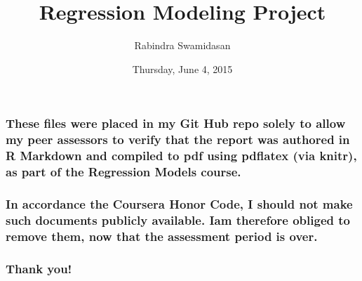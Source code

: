 \documentclass[10pt,]{article}
\title{Regression Modeling Project}
\author{Rabindra Swamidasan}
\date{Thursday, June 4, 2015}
\begin{document}
\maketitle


\subsubsection{These files were placed in my Git Hub repo solely to
allow my peer assessors to verify that the report was authored in R
Markdown and compiled to pdf using pdflatex (via knitr), as part of the
Regression Models
course.}\label{these-files-were-placed-in-my-git-hub-repo-solely-to-allow-my-peer-assessors-to-verify-that-the-report-was-authored-in-r-markdown-and-compiled-to-pdf-using-pdflatex-via-knitr-as-part-of-the-regression-models-course.}

\subsubsection{In accordance the Coursera Honor Code, I should not make
such documents publicly available. Iam therefore obliged to remove them,
now that the assessment period is
over.}\label{in-accordance-the-coursera-honor-code-i-should-not-make-such-documents-publicly-available.-iam-therefore-obliged-to-remove-them-now-that-the-assessment-period-is-over.}

\subsubsection{Thank you!}\label{thank-you}
\end{document}
